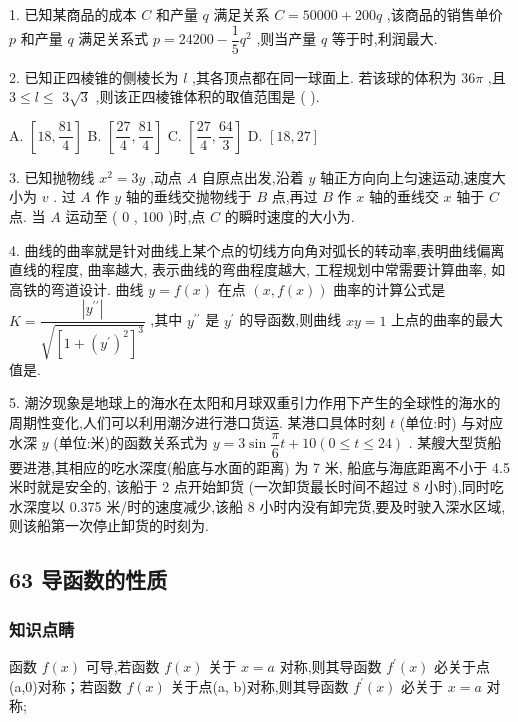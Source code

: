 1. 已知某商品的成本 $C$ 和产量 $q$ 满足关系 $C = {50000} + {200q}$ ,该商品的销售单价 $p$ 和产量 $q$ 满足关系式 $p = {24200} - \dfrac{1}{5}{q}^{2}$ ,则当产量 $q$ 等于\blkda{}时,利润最大.

2. 已知正四棱锥的侧棱长为 $l$ ,其各顶点都在同一球面上. 若该球的体积为 ${36\pi }$ ,且 $3 \leq  l \leq$  $3\sqrt{3}$ ,则该正四棱锥体积的取值范围是 (   ).

A. $\left\lbrack  {{18},\dfrac{81}{4}}\right\rbrack$ B. $\left\lbrack  {\dfrac{27}{4},\dfrac{81}{4}}\right\rbrack$ C. $\left\lbrack  {\dfrac{27}{4},\dfrac{64}{3}}\right\rbrack$ D. $\left\lbrack  {{18},{27}}\right\rbrack$

3. 已知抛物线 ${x}^{2} = {3y}$ ,动点 $A$ 自原点出发,沿着 $y$ 轴正方向向上匀速运动,速度大小为 $v$ . 过 $A$ 作 $y$ 轴的垂线交抛物线于 $B$ 点,再过 $B$ 作 $x$ 轴的垂线交 $x$ 轴于 $C$ 点. 当 $A$ 运动至 ( 0 , 100 )时,点 $C$ 的瞬时速度的大小为\blkda{}.

4. 曲线的曲率就是针对曲线上某个点的切线方向角对弧长的转动率,表明曲线偏离直线的程度, 曲率越大, 表示曲线的弯曲程度越大, 工程规划中常需要计算曲率, 如高铁的弯道设计. 曲线 $y = f\left( x\right)$ 在点 $\left( {x,f\left( x\right) }\right)$ 曲率的计算公式是 $K = \dfrac{\left| {y}^{\prime \prime }\right| }{\sqrt{{\left\lbrack  1 + {\left( {y}^{\prime }\right) }^{2}\right\rbrack  }^{3}}}$ ,其中 ${y}^{\prime \prime }$ 是 ${y}^{\prime }$ 的导函数,则曲线 ${xy} = 1$ 上点的曲率的最大值是\blkda{}.

5. 潮汐现象是地球上的海水在太阳和月球双重引力作用下产生的全球性的海水的周期性变化,人们可以利用潮汐进行港口货运. 某港口具体时刻 $t$ (单位:时) 与对应水深 $y$ (单位:米)的函数关系式为 $y = 3\sin \dfrac{\pi }{6}t + {10}\left( {0 \leq  t \leq  {24}}\right)$ . 某艘大型货船要进港,其相应的吃水深度(船底与水面的距离) 为 7 米, 船底与海底距离不小于 4.5 米时就是安全的, 该船于 2 点开始卸货 (一次卸货最长时间不超过 8 小时),同时吃水深度以 0.375 米/时的速度减少,该船 8 小时内没有卸完货,要及时驶入深水区域,则该船第一次停止卸货的时刻为\blkda{}.

\subsection*{63 导函数的性质}

\subsubsection*{知识点睛}

函数 $f\left( x\right)$ 可导,若函数 $f\left( x\right)$ 关于 $x = a$ 对称,则其导函数 ${f}^{\prime }\left( x\right)$ 必关于点(a,0)对称；若函数 $f\left( x\right)$ 关于点(a, b)对称,则其导函数 ${f}^{\prime }\left( x\right)$ 必关于 $x = a$ 对称;

